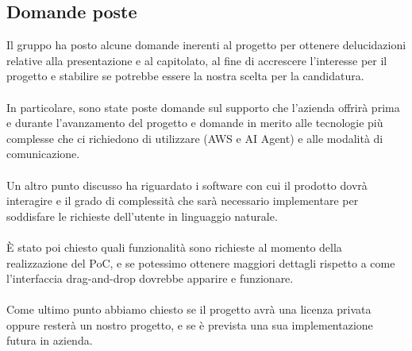 \subsection{Domande poste}
Il gruppo ha posto alcune domande inerenti al progetto per ottenere delucidazioni relative alla presentazione e al capitolato, al fine di accrescere l'interesse per il progetto e stabilire se potrebbe essere la nostra scelta per la candidatura.\\
\\
In particolare, sono state poste domande sul supporto che l’azienda offrirà prima e durante l'avanzamento del progetto e domande in merito alle tecnologie più complesse che ci richiedono di utilizzare (AWS e AI Agent) e alle modalità di comunicazione.\\
\\
Un altro punto discusso ha riguardato i software con cui il prodotto dovrà interagire e il grado di complessità che sarà necessario implementare per soddisfare le richieste dell'utente in linguaggio naturale.\\
\\
È stato poi chiesto quali funzionalità sono richieste al momento della realizzazione del PoC, e se potessimo ottenere maggiori dettagli rispetto a come l'interfaccia drag-and-drop dovrebbe apparire e funzionare.\\
\\
Come ultimo punto abbiamo chiesto se il progetto avrà una licenza privata oppure resterà un nostro progetto, e se è prevista una sua implementazione futura in azienda.

